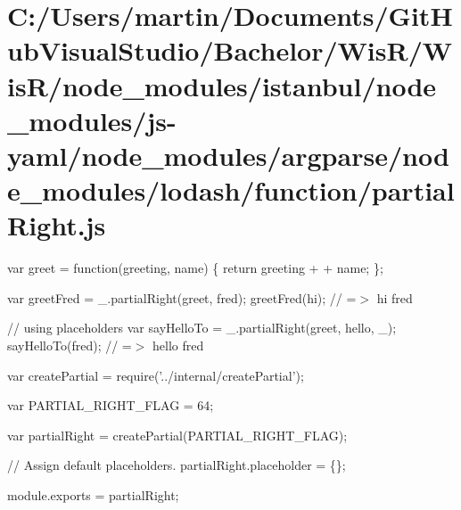 \hypertarget{_c_1_2_users_2martin_2_documents_2_git_hub_visual_studio_2_bachelor_2_wis_r_2_wis_r_2node_module5a24d23c9aed4f49ccb05207c132c3c3}{}\section{C\+:/\+Users/martin/\+Documents/\+Git\+Hub\+Visual\+Studio/\+Bachelor/\+Wis\+R/\+Wis\+R/node\+\_\+modules/istanbul/node\+\_\+modules/js-\/yaml/node\+\_\+modules/argparse/node\+\_\+modules/lodash/function/partial\+Right.\+js}
var greet = function(greeting, name) \{ return greeting + \textquotesingle{} \textquotesingle{} + name; \};

var greet\+Fred = \+\_\+.\+partial\+Right(greet, \textquotesingle{}fred\textquotesingle{}); greet\+Fred(\textquotesingle{}hi\textquotesingle{}); // =$>$ \textquotesingle{}hi fred\textquotesingle{}

// using placeholders var say\+Hello\+To = \+\_\+.\+partial\+Right(greet, \textquotesingle{}hello\textquotesingle{}, \+\_\+); say\+Hello\+To(\textquotesingle{}fred\textquotesingle{}); // =$>$ \textquotesingle{}hello fred\textquotesingle{}


\begin{DoxyCodeInclude}
var createPartial = require(\textcolor{stringliteral}{'../internal/createPartial'});

var PARTIAL\_RIGHT\_FLAG = 64;

var partialRight = createPartial(PARTIAL\_RIGHT\_FLAG);

\textcolor{comment}{// Assign default placeholders.}
partialRight.placeholder = \{\};

module.exports = partialRight;
\end{DoxyCodeInclude}
 